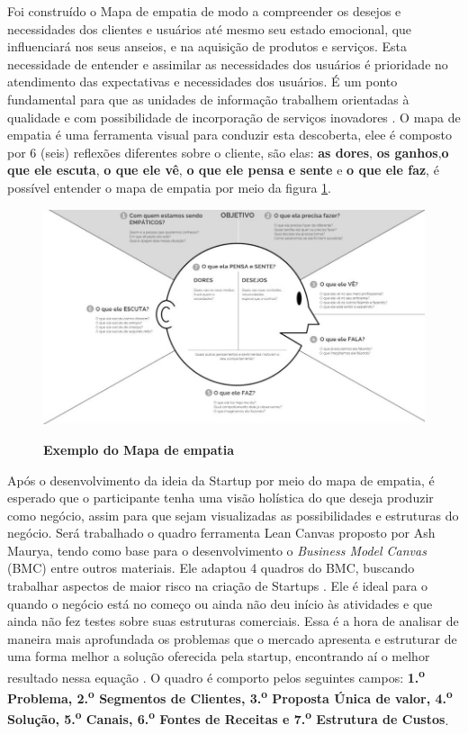 Foi construído o Mapa de empatia de modo a compreender os desejos e necessidades dos clientes e usuários até mesmo seu estado emocional, que influenciará nos seus anseios, e na  aquisição de produtos e serviços. Esta necessidade de entender e assimilar as necessidades dos usuários é prioridade no atendimento das expectativas e necessidades dos usuários. É um ponto fundamental para que as unidades de informação trabalhem orientadas à qualidade e com possibilidade de incorporação de serviços inovadores \cite{valdrich_mapa_2018}. O mapa de empatia é uma ferramenta visual para conduzir esta descoberta, elee é composto por 6 (seis) reflexões diferentes sobre o cliente, são elas: \textbf{as dores}, \textbf{os ganhos},\textbf{o que ele escuta}, \textbf{o que ele vê}, \textbf{o que ele pensa e sente} e  \textbf{o que ele faz}, é possível entender o mapa de empatia por meio da figura \ref{figura_6}. 


\begin{figure}[H]
\centering
\caption{\textbf{Exemplo do Mapa de empatia}}
\includegraphics[scale=0.4]{Imagens/mapa_empatia.jpg}
\label{figura_6}
\end{figure}


Após o desenvolvimento da ideia da Startup por meio do mapa de empatia, é esperado que o participante tenha uma visão holística do que deseja produzir como negócio, assim para que sejam visualizadas as possibilidades e estruturas do negócio. Será trabalhado o quadro ferramenta Lean Canvas proposto por Ash Maurya, tendo como base para o desenvolvimento o \textit{Business Model Canvas} (BMC) entre outros materiais. Ele adaptou 4 quadros do BMC, buscando trabalhar aspectos de maior risco na criação de Startups \cite{maurya_running_2012}. Ele é ideal para o quando o negócio está no começo ou ainda não deu início às atividades e que ainda não fez testes sobre suas estruturas comerciais. Essa é a hora de analisar de maneira mais aprofundada os problemas que o mercado apresenta e estruturar de uma forma melhor a solução oferecida pela startup, encontrando aí o melhor resultado nessa equação \cite{sebrae_aprenda_2019}. O quadro é comporto pelos seguintes campos: \textbf{1.\textsuperscript{o} Problema, 2.\textsuperscript{o} Segmentos de Clientes, 3.\textsuperscript{o} Proposta Única de valor, 4.\textsuperscript{o} Solução, 5.\textsuperscript{o} Canais, 6.\textsuperscript{o} Fontes de Receitas e 7.\textsuperscript{o} Estrutura de Custos}. 

